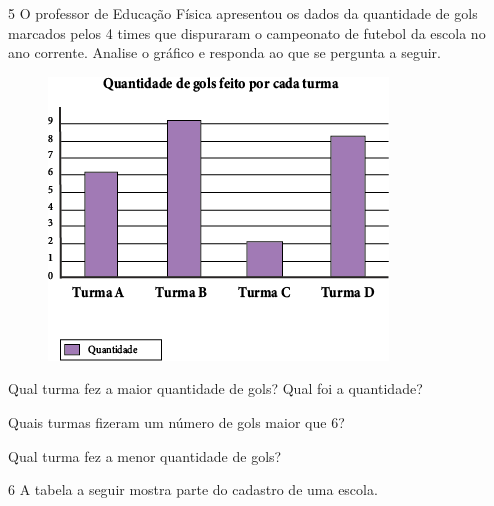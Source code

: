 \num{5} O professor de Educação Física apresentou os dados da quantidade de gols
marcados pelos 4 times que dispuraram o campeonato de futebol da escola no ano
corrente. Analise o gráfico e responda ao que se pergunta a seguir.

\begin{figure}[htpb!]
\centering
\includegraphics[width=.85\textwidth]{media/image44.png}
\end{figure}

\begin{escolha}
\item
  Qual turma fez a maior quantidade de gols? Qual foi a quantidade?


\item
  Quais turmas fizeram um número de gols maior que 6?


\item
  Qual turma fez a menor quantidade de gols?

\end{escolha}

\pagebreak
\num{6} A tabela a seguir mostra parte do cadastro de uma escola.

